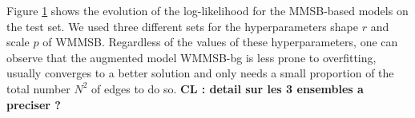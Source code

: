 Figure \ref{fig:conv_entropy} shows the evolution of the log-likelihood for the MMSB-based models on the test set. We used three different sets for the hyperparameters shape $r$ and scale $p$ of WMMSB. Regardless of the values of these hyperparameters, one can observe that the augmented model WMMSB-bg is less prone to overfitting, usually converges to a better solution and only needs a small proportion of the total number $N^2$ of edges to do so.
\textbf{CL : detail sur les 3 ensembles a preciser ?} 

\begin{figure}[h]
\centering
	
    \label{fig:conv_entropy}
\end{figure}








